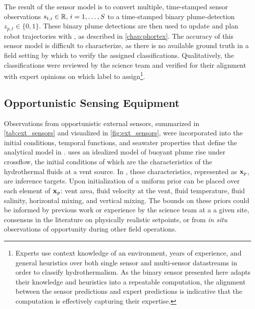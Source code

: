 The result of the sensor model is to convert multiple, time-stamped sensor observations $s_{t, i} \in \mathbb{R}, \, i = 1, \dots, S$ to a time-stamped binary plume-detection $z_{p, t} \in \{0, 1\}$. These binary plume detections are then used to update \PHUMES and plan robot trajectories with \PHORTEX, as described in \cref{chap:phortex}. The accuracy of this sensor model is difficult to characterize, as there is no available ground truth in a field setting by which to verify the assigned classifications. Qualitatively, the classifications were reviewed by the science team and verified for their alignment with expert opinions on which label to assign\footnote{Experts use context knowledge of an environment, years of experience, and general heuristics over both single sensor and multi-sensor datastreams in order to classify hydrothermalism. As the binary sensor presented here adapts their knowledge and heuristics into a repeatable computation, the alignment between the sensor predictions and expert predictions is indicative that the computation is effectively capturing their expertise.}.


\subsection{Opportunistic Sensing Equipment}
\label{sec:external_current}
Observations from opportunistic external sensors, summarized in \cref{tab:ext_sensors} and visualized in \cref{fig:ext_sensors}, were incorporated into the initial conditions, temporal functions, and seawater properties that define the analytical model in \PHUMES. \PHUMES uses an idealized model of buoyant plume rise under crossflow, the initial conditions of which are the characteristics of the hydrothermal fluids at a vent source. In \PHUMES, these characteristics, represented as $\mathbf{x}_p$, are inference targets. Upon initialization of \PHUMES a uniform prior can be placed over each element of $\mathbf{x}_p$: vent area, fluid velocity at the vent, fluid temperature, fluid salinity, horizontal mixing, and vertical mixing. The bounds on these priors could be informed by previous work or experience by the science team at a a given site, consensus in the literature on physically realistic setpoints, or from \emph{in situ} observations of opportunity during other field operations.

